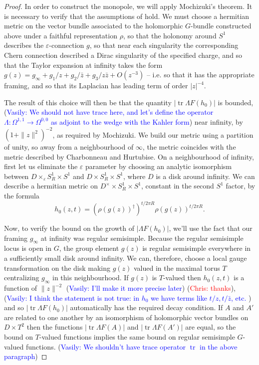 \documentclass[11pt, oneside, reqno]{amsart}
\theoremstyle{definition} \newtheorem{definition}{Definition}[section]
\theoremstyle{definition} \newtheorem{remark}[definition]{Remark}
\theoremstyle{definition} \newtheorem{remarks}[definition]{Remarks}
\theoremstyle{definition} \newtheorem{question}[definition]{Question}
\theoremstyle{definition} \newtheorem*{note}{Note}
\theoremstyle{definition} \newtheorem{example}[definition]{Example}
\theoremstyle{definition} \newtheorem{examples}[definition]{Examples}
\newcommand{\eps}{\varepsilon}
\DeclareMathOperator{\tr}{tr}
\newcommand{\chris}[1]{(\textcolor{red}{Chris: #1})}
\newcommand{\vasily}[1]{(\textcolor{blue}{Vasily: #1})}
\begin{document}
\begin{proof}
In order to construct the monopole, we will apply Mochizuki's theorem.  It is necessary to verify that the assumptions of \cite[Corollary 3.13]{MochizukiKH} hold.  We must choose a hermitian metric on the vector bundle associated to the holomorphic $G$-bundle constructed above under a faithful representation $\rho$, so that the holonomy around $S^1$ describes the $\eps$-connection $g$, so that near each singularity the corresponding Chern connection described a Dirac singularity of the specified charge, and so that the Taylor expansion at infinity takes the form $g(z) = g_\infty +  g_1/z + g_2/\bar{z} + g_3/z \bar{z} + O(z^{-3})$ -- i.e. so that it has the appropriate framing, and so that its Laplacian has leading term of order $|z|^{-4}$. 

The result of this choice will then be that the quantity $|\tr \Lambda F(h_0)|$ is bounded,\vasily{We should not have trace here, and let's define the operator
  $\Lambda: \Omega^{1,1} \to \Omega^{0,0}$ as adjoint to the
wedge with the Kahler form} near infinity, by $(1 +\|z\|^2)^{-2}$, as required by Mochizuki.  We build our metric using a partition of unity, so away from a neighbourhood of $\infty$, the metric coincides with the metric described by Charbonneau and Hurtubise.  On a neighbourhood of infinity, first let us eliminate the $\eps$ parameter by choosing an analytic isomorphism between $D \times_\eps S^1_R \times S^1$ and $D \times S^1_R \times S^1$, where $D$ is a disk around infinity.  We can describe a hermitian metric on $D^\times \times S^1_R \times S^1$, constant in the second $S^1$ factor, by the formula
\[h_0(z,t) = (\rho(g(z))^\dagger)^{t/2\pi R}\rho(g(z))^{t/2\pi R}.\]

Now, to verify the bound on the growth of $|\Lambda F(h_0)|$, we'll use the fact that our framing $g_\infty$ at infinity was regular semisimple.  Because the regular semisimple locus is open in $G$, the group element $g(z)$ is regular semisimple everywhere in a sufficiently small disk around infinity.  We can, therefore, choose a local gauge transformation on the disk making $g(z)$ valued in the maximal torus $T$ centralizing $g_\infty$ in this neighbourhood.  If $g(z)$ is $T$-valued then $h_0(z,t)$ is a function of $\|z\|^{-2}$ \vasily{I'll make it more precise later} \chris{thanks}, \vasily{I think the statement is not true:
in $h_0$ we have terms like $t/z, t/{\bar z}$, etc. } and so $|\tr \Lambda F(h_0)|$ automatically has the required decay condition.  If $A$ and $A'$ are related to one another by an isomorphism of holomorphic vector bundles on $D \times T^2$ then the functions $|\tr \Lambda F(A)|$ and $|\tr \Lambda F(A')|$ are equal, so the bound on $T$-valued functions implies the same bound on regular semisimple $G$-valued functions.
\vasily{We shouldn't have trace operator $\tr$ in the above paragraph}


\end{proof}
\end{document}
